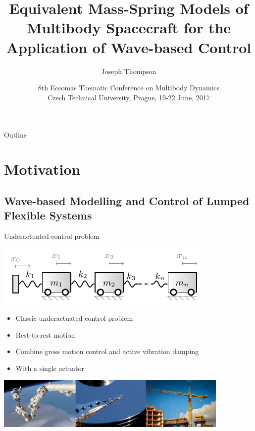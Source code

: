 \documentclass{beamer}
\title[Equivalent Mass-Spring Models]{Equivalent Mass-Spring Models of Multibody Spacecraft for the Application of Wave-based Control}
\author{Joseph Thompson} %
\institute[UCD, Ireland]{University College Dublin, Ireland}
\date[ECCOMAS MBD 2017] %
{8th Eccomas Thematic Conference on Multibody Dynamics \\ \vspace{8pt} \small{Czech Technical University, Prague, 19-22 June, 2017}}
\begin{document}
\begin{frame}
  \titlepage
\end{frame}
\begin{frame}{Outline}
  \tableofcontents
\end{frame}

\section{Motivation}

\subsection{Wave-based Modelling and Control of Lumped Flexible Systems}
\begin{frame}{Underactuated control problem}
\begin{center}
\includegraphics[]{images/lumped_system.pdf}
\end{center}
\begin{itemize}
\item Classic underactuated control problem
\item Rest-to-rest motion
\item Combine gross motion control and active vibration damping
\item With a single actuator
\end{itemize}
\begin{center}
\includegraphics[width=0.85\textwidth]{images/under_actuated_systems.png}
\end{center}
\end{frame}
\end{document}
